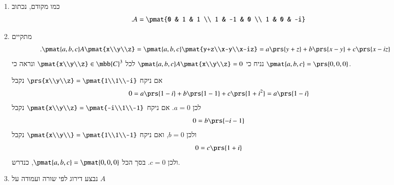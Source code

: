 \documentclass[a4paper,10pt,oneside,openany]{article}
\begin{document}
\begin{solution}
\begin{enumerate}
\item כמו מקודם, נכתוב
\[\text{.} A = \pmat{0 & 1 & 1 \\ 1 & -1 & 0 \\ 1 & 0 & -i}\]

\item
מתקיים
\begin{align*}
\text{.} \pmat{a,b,c} A \pmat{x\\y\\z} &= \pmat{a,b,c}\pmat{y+z\\x-y\\x-iz} = a\prs{y+z} + b\prs{x-y} + c\prs{x-iz}
\end{align*}
נניח כי
$\pmat{a,b,c} A \pmat{x\\y\\z} = 0$
לכל
$\pmat{x\\y\\z} \in \mbb{C}^3$
ונראה כי
$\pmat{a,b,c} = \prs{0,0,0}$.

אם ניקח
$\prs{x\\y\\z} = \pmat{1\\1\\-i}$
נקבל
\[0 = a\prs{1-i} + b\prs{1-1} + c\prs{1+i^2} = a\prs{1-i}\]
לכן
$a = 0$.
אם ניקח
$\pmat{x\\y\\z} = \pmat{-i\\1\\-1}$
נקבל
\[0 = b\prs{-i-1}\]
ולכן
$b = 0$,
ואם ניקח
$\pmat{x\\y\\} = \pmat{1\\1\\-1}$
נקבל
\[0 = c\prs{1+i}\]
ולכן
$c = 0$.
בסך הכל
$\pmat{a,b,c} = \pmat{0,0,0}$,
כנדרש.

\item נבצע דירוג לפי שורה ועמודה על
$A$


\end{enumerate}
\end{solution}
\end{document}
